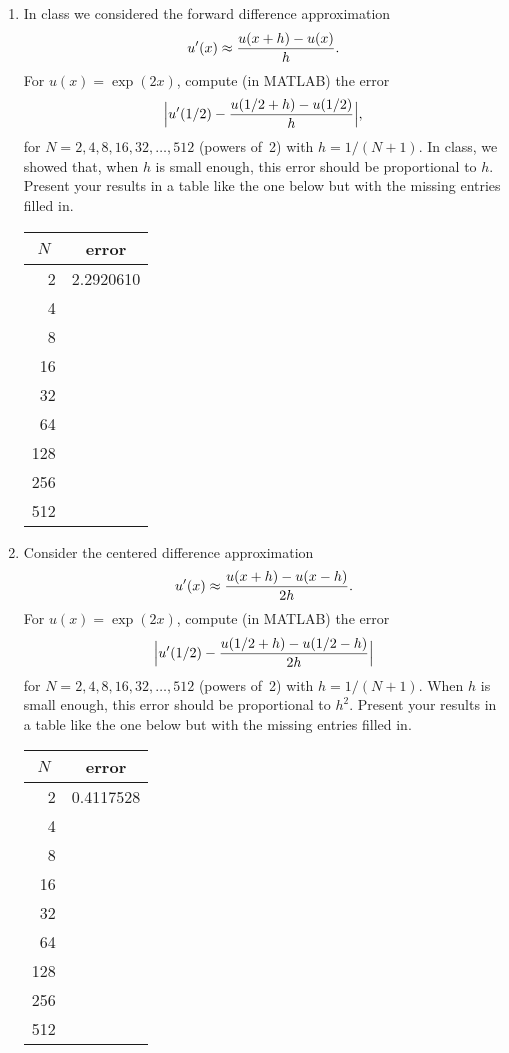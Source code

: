 \begin{enumerate}
\item In class we considered the forward difference approximation
      \[ u'(x) \approx {u(x+h) - u(x) \over h}.\]
      For $u(x) = \exp(2x)$, compute (in MATLAB) the error
         \[ \Big| u'(1/2) -  {u(1/2+h) - u(1/2) \over h}\Big|,\]
      for $N = 2, 4, 8, 16, 32, \ldots, 512$ (powers of~2) with $h=1/(N+1)$. In class, we showed that, when $h$ is small enough, this error should be proportional to $h$. Present your results in a table like the one below but with the missing entries filled in.
\begin{center}
\begin{tabular}{r|r}
\hline
\multicolumn{1}{c|}{$N$} & \multicolumn{1}{c}{error} \\
\hline
   2 &  2.2920610 \\
   4 &   \\
   8 &   \\
  16 &   \\
  32 &   \\
  64 &   \\
 128 &   \\
 256 &   \\
 512 &  
\end{tabular}\end{center}
      
\vspace*{1em} 
\item Consider the centered difference approximation
      \[ u'(x) \approx {u(x+h) - u(x-h) \over 2 h}.\]
      For $u(x) = \exp(2x)$, compute (in MATLAB) the error
         \[ \Big| u'(1/2) -  {u(1/2+h) - u(1/2-h) \over 2h}\Big|\]
      for $N = 2, 4, 8, 16, 32, \ldots, 512$ (powers of~2) with $h=1/(N+1)$. When $h$ is small enough, this error should be proportional to $h^2$. Present your results in a table like the one below but with the missing entries filled in.
\begin{center}
\begin{tabular}{r|r}
\hline
\multicolumn{1}{c|}{$N$} & \multicolumn{1}{c}{error} \\
\hline
   2 &  0.4117528 \\
   4 &   \\
   8 &   \\
  16 &   \\
  32 &   \\
  64 &   \\
 128 &   \\
 256 &   \\
 512 &  
\end{tabular}\end{center}


\end{enumerate}
